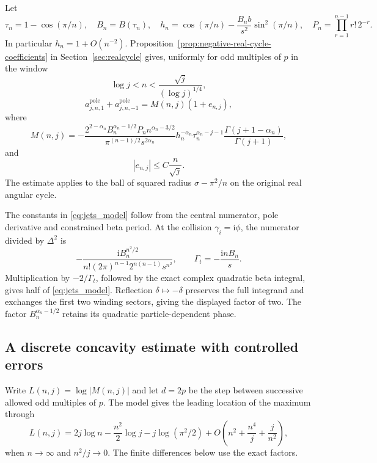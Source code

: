 \documentclass[11pt]{article}
\numberwithin{equation}{section}
\theoremstyle{definition}
\newcommand{\ii}{\mathrm i}
\begin{document}
Let
\begin{equation}\label{eq:jets_model_parameters}
 \tau_n=1-\cos(\pi/n),\quad B_n=B(\tau_n),\quad
 h_n=\cos(\pi/n)-\frac{B_n b}{s^2}\sin^2(\pi/n),\quad
 P_n=\prod_{r=1}^{n-1}r!\,2^{-r}.
\end{equation}
In particular $h_n=1+O(n^{-2})$. Proposition~\ref{prop:negative-real-cycle-coefficients} in
Section~\ref{sec:realcycle} gives, uniformly for odd multiples of $p$
in the window
\[
 \log j<n<\frac{\sqrt j}{(\log j)^{1/4}},
\]
\begin{equation}\label{eq:jets_uniform_model}
 a_{j,n,1}^{\mathrm{pole}}+a_{j,n,-1}^{\mathrm{pole}}
 =M(n,j)(1+e_{n,j}),
\end{equation}
where
\begin{equation}\label{eq:jets_model}
 M(n,j)=-\frac{2^{2-\alpha_n}B_n^{\alpha_n-1/2}P_n
                     n^{\alpha_n-3/2}}
                   {\pi^{(n-1)/2}s^{2\alpha_n}}
 h_n^{-\alpha_n}\tau_n^{\alpha_n-j-1}
 \frac{\Gamma(j+1-\alpha_n)}{\Gamma(j+1)},
\end{equation}
and
\begin{equation}\label{eq:jets_model_errors}
 |e_{n,j}|\le C\frac n{\sqrt j}.
\end{equation}
The estimate applies to the ball of squared radius $\sigma-\pi^2/n$
on the original real angular cycle.

The constants in \eqref{eq:jets_model} follow from the central
numerator, pole derivative and constrained beta period.
At the collision $\gamma_i=\ii\phi$, the numerator divided by
$\Delta^2$ is
\[
 -\frac{\ii B_n^{n^2/2}}
       {n!(2\pi)^{n-1}2^{n(n-1)}s^{n^2}},
 \qquad \Gamma_t=-\frac{\ii nB_n}s.
\]
Multiplication by $-2/\Gamma_t$, followed by the exact complex quadratic beta integral, gives half of \eqref{eq:jets_model}.
Reflection $\delta\mapsto-\delta$ preserves the full integrand and
exchanges the first two winding sectors, giving the displayed
factor of two. The factor $B_n^{\alpha_n-1/2}$ retains its quadratic
particle-dependent phase.

\subsection{A discrete concavity estimate with controlled errors}

Write $L(n,j)=\log|M(n,j)|$ and let $d=2p$ be the step between
successive allowed odd multiples of $p$. The model gives the
leading location of the maximum through
\begin{equation}\label{eq:jets_L_expansion}
 L(n,j)=2j\log n-\frac{n^2}{2}\log j-j\log(\pi^2/2)
       +O\left(n^2+\frac{n^4}{j}+\frac{j}{n^2}\right),
\end{equation}
when $n\to\infty$ and $n^2/j\to0$. The finite differences below
use the exact factors.
\end{document}
